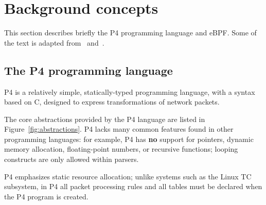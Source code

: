 \section{Background concepts}\label{sec:background}

This section describes briefly the P4 programming language and
eBPF. Some of the text is adapted from~\cite{budiu-osr17}
and~\cite{p4-ebpf-backend}.

\subsection{The P4 programming language}

P4 is a relatively
simple, statically-typed programming language, with a syntax based on
C, designed to express transformations of network packets.

The core abstractions provided by the P4 language are listed in
Figure~\ref{fig:abstractions}.  P4 lacks many common features found in
other programming languages: for example, P4 has \textbf{no} support
for pointers, dynamic memory allocation, floating-point numbers, or
recursive functions; looping constructs are only allowed within
parsers.

P4 emphasizes static resource allocation; unlike systems such as the
Linux TC subsystem, in P4 all packet processing rules and all tables
must be declared when the P4 program is created.

